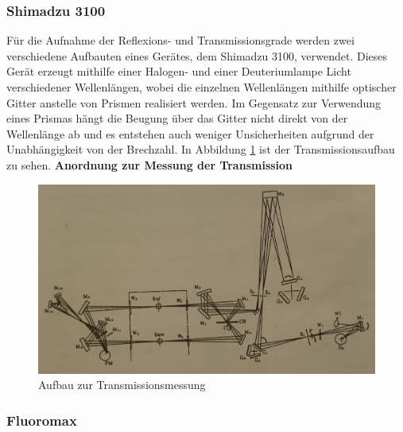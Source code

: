     \subsubsection{Shimadzu 3100}
        Für die Aufnahme der Reflexions- und Transmissionsgrade werden zwei verschiedene Aufbauten eines Gerätes, dem Shimadzu 3100, verwendet. Dieses Gerät erzeugt mithilfe einer Halogen- und einer Deuteriumlampe Licht verschiedener Wellenlängen, wobei die einzelnen Wellenlängen mithilfe optischer Gitter anstelle von Prismen realisiert werden. Im Gegensatz zur Verwendung eines Prismas hängt die Beugung über das Gitter nicht direkt von der Wellenlänge ab und es entstehen auch weniger Unsicherheiten aufgrund der Unabhängigkeit von der Brechzahl. In Abbildung \ref{aufb:transmiss} ist der Transmissionsaufbau zu sehen. 
        \textbf{Anordnung zur Messung der Transmission}
            \begin{figure}
                \includegraphics[scale=0.15]{pic/transmiss_aufbau.png}
                \caption{Aufbau zur Transmissionsmessung}
                \label{aufb:transmiss}
            \end{figure}
    \subsubsection{Fluoromax}
